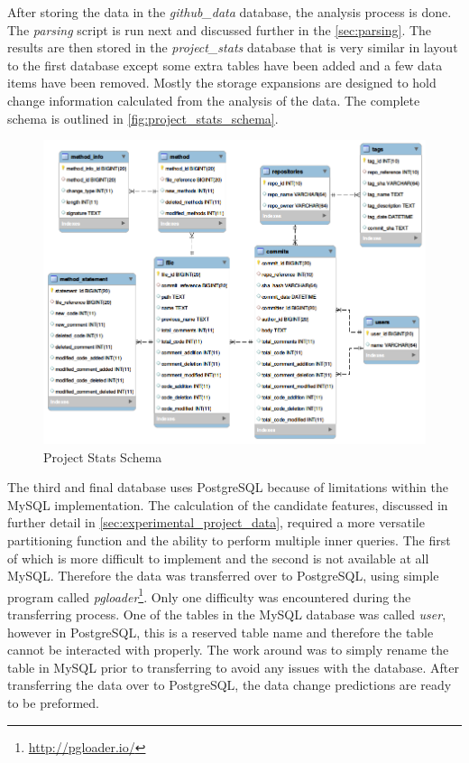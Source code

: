 After storing the data in the \textit{github\_data} database, the analysis process is done. The \textit{parsing} script is run next and discussed further in the \autoref{sec:parsing}. The results are then stored in the \textit{project\_stats} database that is very similar in layout to the first database except some extra tables have been added and a few data items have been removed. Mostly the storage expansions are designed to hold change information calculated from the analysis of the data. The complete schema is outlined in \autoref{fig:project_stats_schema}.

\begin{figure}[!ht]
    \centering
        \includegraphics[width=1.0\textwidth]{images/project_stats_schema}
    \caption{Project Stats Schema}
    \label{fig:project_stats_schema}
\end{figure}

The third and final database uses PostgreSQL because of limitations within the MySQL implementation. The calculation of the candidate features, discussed in further detail in \autoref{sec:experimental_project_data}, required a more versatile partitioning function and the ability to perform multiple inner queries. The first of which is more difficult to implement and the second is not available at all MySQL. Therefore the data was transferred over to PostgreSQL, using simple program called \textit{pgloader}\footnote{\url{http://pgloader.io/}}. Only one difficulty was encountered during the transferring process. One of the tables in the MySQL database was called \textit{user}, however in PostgreSQL, this is a reserved table name and therefore the table cannot be interacted with properly. The work around was to simply rename the table in MySQL prior to transferring to avoid any issues with the database. After transferring the data over to PostgreSQL, the data change predictions are ready to be preformed.

